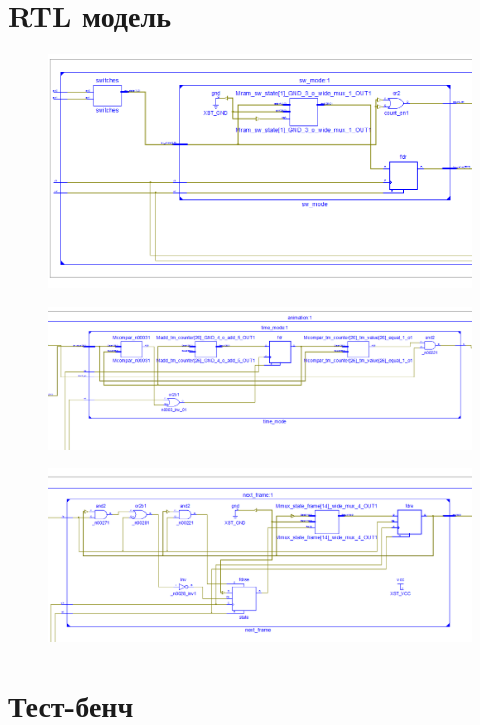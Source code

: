 \documentclass[a4paper, 10pt]{article}
\begin{document}
     \section*{RTL модель}
        \begin{figure}[h!]
            \includegraphics[scale=0.5]{../images/rtl1.PNG}
        \end{figure}
                 \begin{figure}[h!]
            \includegraphics[scale=0.5]{../images/rtl2.PNG}
        \end{figure}
                 \begin{figure}[h!]
            \includegraphics[scale=0.5]{../images/rtl3.PNG}
        \end{figure}
     \section*{Тест-бенч}
        
\end{document}

